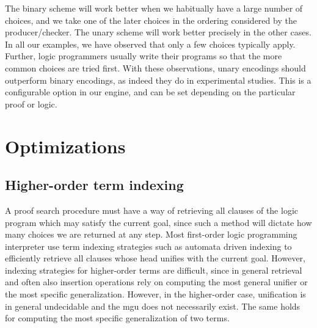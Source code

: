 \documentclass{llncs}
\begin{document}
The binary scheme will work better when we habitually have a large
number of choices, and we take one of the later choices in the
ordering considered by the producer/checker. The unary scheme will
work better precisely in the other cases. In all our examples, we have
observed that only a few choices typically apply. Further, logic
programmers usually write their programs so that the more common
choices are tried first. With these observations, unary encodings
should outperform binary encodings, as indeed they do in experimental
studies. This is a configurable option in our engine, and can be set
depending on the particular proof or logic.

\section{Optimizations}
\subsection{Higher-order term indexing}\label{sec:indexing}

A proof search procedure must have a way of retrieving all clauses of
the logic program which may satisfy the current goal, since such a
method will dictate how many choices we are returned at any step.
Most first-order logic programming interpreter use term indexing
strategies such as automata driven indexing \cite{} to efficiently
retrieve all clauses whose head unifies with the current goal. 
However, indexing strategies for higher-order terms are difficult,
since in general retrieval and often also insertion operations rely on
computing the most general unifier or the most specific
generalization. However, in the higher-order case, unification is in
general undecidable and the mgu does not necessarily exist. The same
holds for computing the most specific generalization of two terms. 
\end{document}
